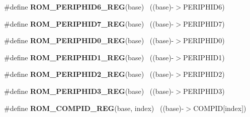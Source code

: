 \begin{DoxyCompactItemize}
\item 
\hypertarget{group___r_o_m___register___accessor___macros_gaa17fd4c87fd03067cc92e50bd19d80f2}{}\#define {\bfseries R\+O\+M\+\_\+\+P\+E\+R\+I\+P\+H\+I\+D6\+\_\+\+R\+E\+G}(base)                                ~((base)-\/$>$P\+E\+R\+I\+P\+H\+I\+D6)\label{group___r_o_m___register___accessor___macros_gaa17fd4c87fd03067cc92e50bd19d80f2}

\item 
\hypertarget{group___r_o_m___register___accessor___macros_gafc33cdefda2f13fd467d3dd8a277bc71}{}\#define {\bfseries R\+O\+M\+\_\+\+P\+E\+R\+I\+P\+H\+I\+D7\+\_\+\+R\+E\+G}(base)                                ~((base)-\/$>$P\+E\+R\+I\+P\+H\+I\+D7)\label{group___r_o_m___register___accessor___macros_gafc33cdefda2f13fd467d3dd8a277bc71}

\item 
\hypertarget{group___r_o_m___register___accessor___macros_gab7954217027d7a738dcb0043b21c7c88}{}\#define {\bfseries R\+O\+M\+\_\+\+P\+E\+R\+I\+P\+H\+I\+D0\+\_\+\+R\+E\+G}(base)                                ~((base)-\/$>$P\+E\+R\+I\+P\+H\+I\+D0)\label{group___r_o_m___register___accessor___macros_gab7954217027d7a738dcb0043b21c7c88}

\item 
\hypertarget{group___r_o_m___register___accessor___macros_gaf4bae6e0e9b6a84e0b35e3cc47ceb932}{}\#define {\bfseries R\+O\+M\+\_\+\+P\+E\+R\+I\+P\+H\+I\+D1\+\_\+\+R\+E\+G}(base)                                ~((base)-\/$>$P\+E\+R\+I\+P\+H\+I\+D1)\label{group___r_o_m___register___accessor___macros_gaf4bae6e0e9b6a84e0b35e3cc47ceb932}

\item 
\hypertarget{group___r_o_m___register___accessor___macros_ga1e29fa2f23582f8b1d84d500955d3430}{}\#define {\bfseries R\+O\+M\+\_\+\+P\+E\+R\+I\+P\+H\+I\+D2\+\_\+\+R\+E\+G}(base)                                ~((base)-\/$>$P\+E\+R\+I\+P\+H\+I\+D2)\label{group___r_o_m___register___accessor___macros_ga1e29fa2f23582f8b1d84d500955d3430}

\item 
\hypertarget{group___r_o_m___register___accessor___macros_ga69bf49b73f7571be987344826b1586a2}{}\#define {\bfseries R\+O\+M\+\_\+\+P\+E\+R\+I\+P\+H\+I\+D3\+\_\+\+R\+E\+G}(base)                                ~((base)-\/$>$P\+E\+R\+I\+P\+H\+I\+D3)\label{group___r_o_m___register___accessor___macros_ga69bf49b73f7571be987344826b1586a2}

\item 
\hypertarget{group___r_o_m___register___accessor___macros_ga6c627260c5decb61186ddcb1ebef66b5}{}\#define {\bfseries R\+O\+M\+\_\+\+C\+O\+M\+P\+I\+D\+\_\+\+R\+E\+G}(base,  index)                          ~((base)-\/$>$C\+O\+M\+P\+I\+D\mbox{[}index\mbox{]})\label{group___r_o_m___register___accessor___macros_ga6c627260c5decb61186ddcb1ebef66b5}


\end{DoxyCompactItemize}
